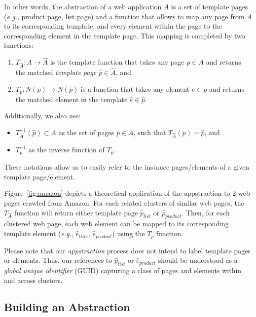 In other words, the abstraction of a web application $A$ is a set of template pages (\emph{e.g.}, product page, list page) and a function that allows to map any page from $A$ to its corresponding template, and every element within the page to the corresponding element in the template page.
This mapping is completed by two functions:
\begin{enumerate}
\item $T_{\hat{A}}: A \to \hat{A}$ is the template function that takes any page $p \in A$ and returns the matched \emph{template page} $\hat{p} \in \hat{A}$, and
\item $T_{\hat{p}}: N(p) \to N(\hat{p})$ is a function that takes any element $e \in p$ and returns the matched element in the template $\hat{e} \in \hat{p}$.
\end{enumerate}

Additionally, we also use:
\begin{itemize}
  \item $T^{-1}_{\hat{A}}(\hat{p}) \subset A$ as the set of pages $p \in A$, such that $T_{\hat{A}}(p) = \hat{p}$, and 
  \item $T^{-1}_{\hat{p}}$ as the inverse function of $T_{\hat{p}}$.
\end{itemize}
These notations allow us to easily refer to the instance pages/elements of a given template page/element.

Figure~\ref{fig:amazon} depicts a theoretical application of the appstraction to 2 web pages crawled from Amazon.
For each related clusters of similar web pages, the $T_{\hat{A}}$ function will return either template page $\hat{p}_{list}$ or $\hat{p}_{product}$.
Then, for each clustered web page, each web element can be mapped to its corresponding template element (\emph{e.g.}, $\hat{e}_{title}$, $\hat{e}_{product}$) using the $T_{\hat{p}}$ function.

Please note that our \emph{appstraction} process does not intend to label template pages or elements.
Thus, our references to $\hat{p}_{list}$ or $\hat{e}_{product}$ should be understood as a \emph{global unique identifier} (GUID) capturing a class of pages and elements within and across clusters.

\subsection{Building an Abstraction}

